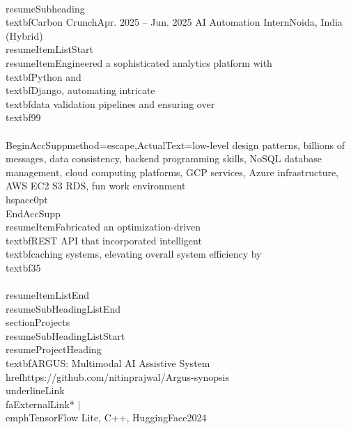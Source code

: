 \documentclass[a4paper]{extarticle}
\makeatletter
\renewcommand\normalsize{\fontsize{9}{11}\selectfont}
\newcommand{\resumeItem}[1]{
  \item\normalsize{
    {#1 \vspace{-2pt}}
  }
}
\newcommand{\resumeSubheading}[4]{
  \vspace{-2pt}\item
    \begin{tabular*}{1.0\textwidth}[t]{l@{\extracolsep{\fill}}r}
      \textbf{#1} & \textbf{\small #2} \
      \textit{\small#3} & \textit{\small #4} \
    \end{tabular*}\vspace{-7pt}
}
\newcommand{\resumeProjectHeading}[2]{
    \item
    \begin{tabular*}{0.97\textwidth}{l@{\extracolsep{\fill}}r}
      \small#1 & \textbf{\small #2}\
    \end{tabular*}\vspace{-7pt}
}
\newcommand{\resumeSubHeadingListStart}{\begin{itemize}[leftmargin=0.0in, label={}]}
\newcommand{\resumeSubHeadingListEnd}{\end{itemize}}
\newcommand{\resumeItemListStart}{\begin{itemize}}
\newcommand{\resumeItemListEnd}{\end{itemize}\vspace{-8pt}}
\makeatother
\begin{document}
{{{{    \\resumeSubheading
    {\\textbf{Carbon Crunch}}{Apr. 2025 -- Jun. 2025}
    {AI Automation Intern}{Noida, India (Hybrid)}
    \\resumeItemListStart
        \\resumeItem{Engineered a sophisticated analytics platform with \\textbf{Python} and \\textbf{Django}, automating intricate \\textbf{data validation} pipelines and ensuring over \\textbf{99\\%
        \\BeginAccSupp{method=escape,ActualText={low-level design patterns, billions of messages, data consistency, backend programming skills, NoSQL database management, cloud computing platforms, GCP services, Azure infrastructure, AWS EC2 S3 RDS, fun work environment}}\\hspace{0pt}\\EndAccSupp{}
        \\resumeItem{Fabricated an optimization-driven \\textbf{REST API} that incorporated intelligent \\textbf{caching systems}, elevating overall system efficiency by \\textbf{35\\%
    \\resumeItemListEnd
\\resumeSubHeadingListEnd
\\section{Projects}
\\resumeSubHeadingListStart
    \\resumeProjectHeading
    {\\textbf{ARGUS: Multimodal AI Assistive System} {\\href{https://github.com/nitinprajwal/Argus-synopsis}{\\underline{Link \\faExternalLink*}}} $|$ \\emph{TensorFlow Lite, C++, HuggingFace}}{2024}
}}}}}}}}
\end{document}

